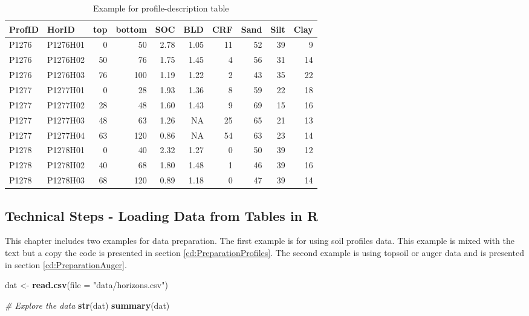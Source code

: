 \documentclass[10pt,b5paper,]{book}
\newenvironment{Shaded}{\begin{snugshade}}{\end{snugshade}}
\newcommand{\CommentTok}[1]{\textcolor[rgb]{0.56,0.35,0.01}{\textit{#1}}}
\newcommand{\DataTypeTok}[1]{\textcolor[rgb]{0.13,0.29,0.53}{#1}}
\newcommand{\KeywordTok}[1]{\textcolor[rgb]{0.13,0.29,0.53}{\textbf{#1}}}
\newcommand{\NormalTok}[1]{#1}
\newcommand{\StringTok}[1]{\textcolor[rgb]{0.31,0.60,0.02}{#1}}
\theoremstyle{definition}
\theoremstyle{definition}
\theoremstyle{definition}
\theoremstyle{remark}
\begin{document}
\begin{table}

\caption{\label{tab:horizon-level}Example for profile-description table}
\centering
\begin{tabular}[t]{llrrrrrrrr}
\toprule
ProfID & HorID & top & bottom & SOC & BLD & CRF & Sand & Silt & Clay\\
\midrule
P1276 & P1276H01 & 0 & 50 & 2.78 & 1.05 & 11 & 52 & 39 & 9\\
P1276 & P1276H02 & 50 & 76 & 1.75 & 1.45 & 4 & 56 & 31 & 14\\
P1276 & P1276H03 & 76 & 100 & 1.19 & 1.22 & 2 & 43 & 35 & 22\\
P1277 & P1277H01 & 0 & 28 & 1.93 & 1.36 & 8 & 59 & 22 & 18\\
P1277 & P1277H02 & 28 & 48 & 1.60 & 1.43 & 9 & 69 & 15 & 16\\
\addlinespace
P1277 & P1277H03 & 48 & 63 & 1.26 & NA & 25 & 65 & 21 & 13\\
P1277 & P1277H04 & 63 & 120 & 0.86 & NA & 54 & 63 & 23 & 14\\
P1278 & P1278H01 & 0 & 40 & 2.32 & 1.27 & 0 & 50 & 39 & 12\\
P1278 & P1278H02 & 40 & 68 & 1.80 & 1.48 & 1 & 46 & 39 & 16\\
P1278 & P1278H03 & 68 & 120 & 0.89 & 1.18 & 0 & 47 & 39 & 14\\
\bottomrule
\end{tabular}
\end{table}

\hypertarget{technical-steps---loading-data-from-tables-in-r}{%
\subsection{Technical Steps - Loading Data from Tables in
R}\label{technical-steps---loading-data-from-tables-in-r}}

This chapter includes two examples for data preparation. The first
example is for using soil profiles data. This example is mixed with the
text but a copy the code is presented in section
\ref{cd:PreparationProfiles}. The second example is using topsoil or
auger data and is presented in section \ref{cd:PreparationAuger}.

\begin{Shaded}
\begin{Highlighting}[]
\NormalTok{dat <-}\StringTok{ }\KeywordTok{read.csv}\NormalTok{(}\DataTypeTok{file =} \StringTok{"data/horizons.csv"}\NormalTok{)}

\CommentTok{# Explore the data}
\KeywordTok{str}\NormalTok{(dat)}
\KeywordTok{summary}\NormalTok{(dat)}
\end{Highlighting}
\end{Shaded}
\end{document}
